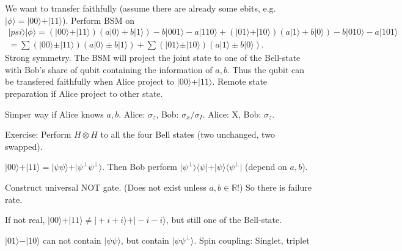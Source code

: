 \documentclass{article}
\newcommand{\ket}[1]{\vert #1\rangle}
\newcommand{\ketbra}[2]{\vert #1\rangle \langle #2\vert}
\begin{document}
\begin{spacing}{1.2}
We want to transfer faithfully (assume there are already some ebits, e.g. $\ket\phi =\ket{00}+\ket{11}$). Perform BSM on \begin{gather*}
\ket{psi}\ket{\phi} = (\ket{00}+\ket{11})(a\ket0 + b\ket1) - b\ket{001} - a\ket{110} + (\ket{01}+\ket{10})(a\ket1 + b\ket{0}) - b\ket{010}-a\ket{101}\\
=\sum(\ket{00}\pm\ket{11})(a\ket0 \pm b\ket1) + \sum(\ket{01}\pm \ket{10})(a\ket1 \pm b\ket0).
\end{gather*}
Strong symmetry. The BSM will project the joint state to one of the Bell-state with Bob's share of qubit containing the information of $a,b$. Thus the qubit can be transfered faithfully when Alice project to $\ket{00}+\ket{11}$. Remote state preparation if Alice project to other state.

Simper way if Alice knows $a,b$. Alice: $\sigma_z$, Bob: $\sigma_x/ \sigma_I$. Alice: X, Bob: $\sigma_z$.

Exercise: Perform $H\otimes H$ to all the four Bell states (two unchanged, two swapped).

$\ket{00}+\ket{11} = \ket{\psi\psi}+\ket{\psi^\perp \psi^\perp}$. Then Bob perform $\ketbra{\psi^\perp}{\psi}+\ketbra{\psi}{\psi^\perp}$ (depend on $a,b$).


Construct universal NOT gate. (Does not exist unless $a,b\in\mathbb{R}$!)  So there is failure rate.

If not real, $\ket{00}+\ket{11}\neq \ket{+i+i}+\ket{-i-i}$, but still one of the Bell-state.

$\ket{01}-\ket{10}$ can not contain $\ket{\psi\psi}$, but contain $\ket{\psi \psi^\perp}$. Spin coupling: Singlet, triplet



\end{spacing}
\end{document}
